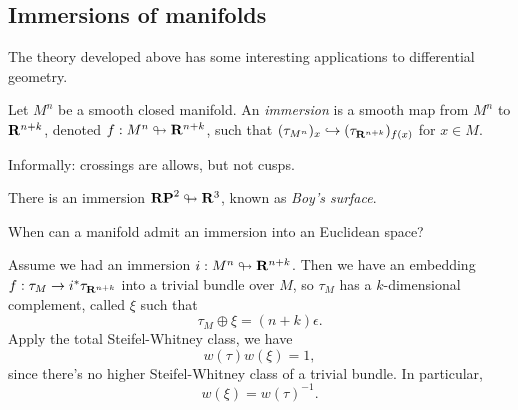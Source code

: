 \subsection{Immersions of manifolds}
The theory developed above has some interesting applications to differential
geometry.
\begin{definition}
    Let $M^n$ be a smooth closed manifold. An \emph{immersion} is a smooth map
    from $M^n$ to $\mathbf R^{n+k}$, denoted $f:M^n\looparrowright \mathbf R^{n+k}$, such
    that $(\tau_{M^n})_x \hookrightarrow (\tau_{\mathbf R^{n+k}})_{f(x)}$ for $x\in
    M$.
\end{definition}
Informally: crossings are allows, but not cusps.
\begin{example}
    There is an immersion $\mathbf{RP}^2 \looparrowright \mathbf R^3$, known as \emph{Boy's
    surface}.
\end{example}
\begin{question}
    When can a manifold admit an immersion into an Euclidean space?
\end{question}
Assume we had an immersion $i:M^n\looparrowright \mathbf R^{n+k}$.
Then we have an embedding $f:\tau_M \to i^\ast \tau_{\mathbf R^{n+k}}$ into a trivial
bundle over $M$, so $\tau_M$ has a $k$-dimensional complement, called $\xi$
such that
$$\tau_M\oplus\xi = (n+k)\epsilon.$$
Apply the total Steifel-Whitney class, we have
$$w(\tau)w(\xi) = 1,$$
since there's no higher Steifel-Whitney class of a trivial bundle. In
particular,
$$
w(\xi) = w(\tau)^{-1}.
$$
